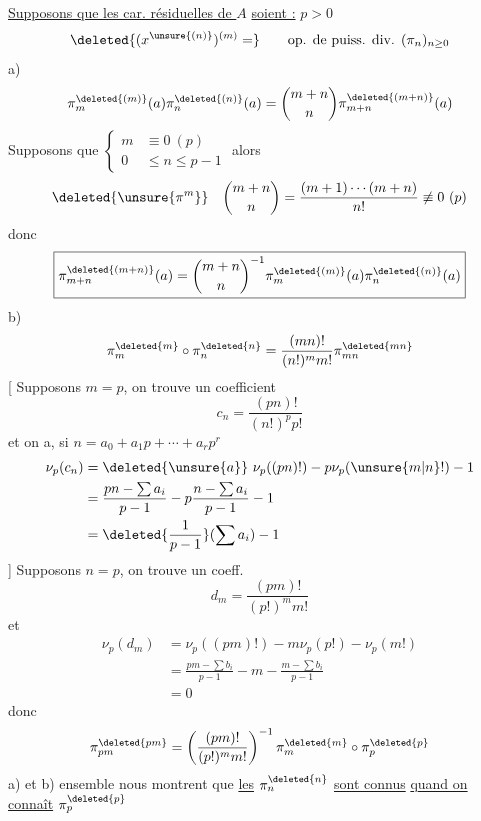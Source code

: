 \uline{Supposons que les car. résiduelles de $A$} \uline{soient :} $p>0$
\[
\deleted{(x^{\unsure{(n)}})^{(m)}=}\qquad\text{op. de puiss. div. }(\pi_n)_{n\geq0}
\]
a)
\[
\pi_m^{\deleted{(m)}}(a)\pi_n^{\deleted{(n)}}(a)=\binom{m+n}{n}\pi_{m+n}^{\deleted{(m+n)}}(a)
\]
Supposons que $\left\{\begin{aligned}m&\equiv0\ (p)\\0&\leq n\leq p-1\end{aligned}\right.$ alors
\[
\deleted{\unsure{\pi^m}}\quad\binom{m+n}{n}=\frac{(m+1)\cdots(m+n)}{n!}\not\equiv0\ (p)
\]
donc
\[
\boxed{\pi_{m+n}^{\deleted{(m+n)}}(a)=\binom{m+n}{n}^{-1}\pi_m^{\deleted{(m)}}(a)\pi_n^{\deleted{(n)}}(a)}
\]
b)
\[
\pi_m^{\deleted{m}}\circ\pi_n^{\deleted{n}}=\frac{(mn)!}{(n!)^m m!}\pi_{mn}^{\deleted{mn}}
\]
[ Supposons $m=p$, on trouve un coefficient
\[
c_n=\frac{(pn)!}{(n!)^p p!}
\]
et on a, si $n=a_0+a_1p+\cdots+a_rp^r$
\[
\begin{aligned}
\nu_p(c_n)&=\deleted{\unsure{a}}\ \nu_p((pn)!)-p\nu_p(\unsure{m|n}!)-1\\
&=\frac{pn-\sum a_i}{p-1}-p\frac{n-\sum a_i}{p-1}-1\\
&=\deleted{\frac{1}{p-1}}(\sum a_i)-1
\end{aligned}
\]
]
Supposons $n=p$, on trouve un coeff.
\[
d_m=\frac{(pm)!}{(p!)^m m!}
\]
et
\[
\begin{aligned}
\nu_p(d_m)&=\nu_p((pm)!)-m\nu_p(p!)-\nu_p(m!)\\
&=\frac{pm-\sum b_i}{p-1}-m-\frac{m-\sum b_i}{p-1}\\
&=0
\end{aligned}
\]
donc
\[
\pi_{pm}^{\deleted{pm}}=\left(\frac{(pm)!}{(p!)^m m!}\right)^{-1}\pi_m^{\deleted{m}}\circ\pi_p^{\deleted{p}}
\]
a) et b) ensemble nous montrent que \uline{les} $\pi_n^{\deleted{n}}$ \uline{sont connus} \uline{quand on connaît} $\pi_p^{\deleted{p}}$
